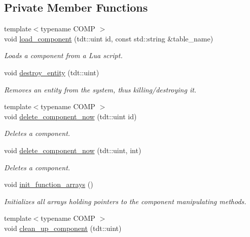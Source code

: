 \subsection*{Private Member Functions}
\begin{DoxyCompactItemize}
\item 
{\footnotesize template$<$typename C\+O\+MP $>$ }\\void \hyperlink{class_entity_system_ac2d122f65e967b51cc37227b5dd0a7fe}{load\+\_\+component} (tdt\+::uint id, const std\+::string \&table\+\_\+name)
\begin{DoxyCompactList}\small\item\em Loads a component from a Lua script. \end{DoxyCompactList}\item 
void \hyperlink{class_entity_system_a4ecd6127995602d98736cd1cf5799c11}{destroy\+\_\+entity} (tdt\+::uint)
\begin{DoxyCompactList}\small\item\em Removes an entity from the system, thus killing/destroying it. \end{DoxyCompactList}\item 
{\footnotesize template$<$typename C\+O\+MP $>$ }\\void \hyperlink{class_entity_system_ad52fb0d17a2fbd056ffd455b6a1171c7}{delete\+\_\+component\+\_\+now} (tdt\+::uint id)
\begin{DoxyCompactList}\small\item\em Deletes a component. \end{DoxyCompactList}\item 
void \hyperlink{class_entity_system_a99ae4bc51a7e97da9bb8ebb56443b70e}{delete\+\_\+component\+\_\+now} (tdt\+::uint, int)
\begin{DoxyCompactList}\small\item\em Deletes a component. \end{DoxyCompactList}\item 
void \hyperlink{class_entity_system_a54c64fce9cd3fe9f1d2502f0d2b4a93e}{init\+\_\+function\+\_\+arrays} ()
\begin{DoxyCompactList}\small\item\em Initializes all arrays holding pointers to the component manipulating methods. \end{DoxyCompactList}\item 
{\footnotesize template$<$typename C\+O\+MP $>$ }\\void \hyperlink{class_entity_system_abbe94182987541e7047ee1a8fa3388b7}{clean\+\_\+up\+\_\+component} (tdt\+::uint)

\end{DoxyCompactItemize}
